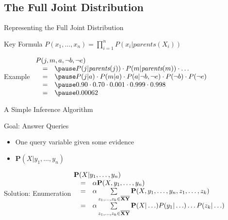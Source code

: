 \documentclass[14pt]{beamer}
\begin{document}
\subsection{The Full Joint Distribution}
\begin{frame}{Representing the Full Joint Distribution}
	\begin{block}{Key Formula}
		$P(x_{1},\ldots,x_{n}) = \prod\limits_{i=1}^{n}{P(x_{i}|\textit{parents}(X_{i}))}$
	\end{block}
	\begin{block}{Example}
		$
		\begin{array}{lll}
			\lefteqn{P(j, m, a, \lnot b, \lnot e)}
			\\
			& = & \pause
			      P(j|\textit{parents}(j)) \cdot
			      P(m|\textit{parents}(m)) \cdot
			      \ldots
			\\
			& = & \pause
			      P(j|a) \cdot
			      P(m|a) \cdot
			      P(a|\lnot b, \lnot e) \cdot
			      P(\lnot b) \cdot
			      P(\lnot e)
			\\
			& = & \pause
			      0.90 \cdot
			      0.70 \cdot
			      0.001 \cdot
			      0.999 \cdot
			      0.998
			\\
			& = & \pause
			      0.00062
		\end{array}
		$
	\end{block}
\end{frame}
\begin{frame}{A Simple Inference Algorithm}
	\begin{block}{Goal: Answer Queries}
		\begin{itemize}
			\item One query variable given some evidence
			\item $\mathbf{P}(X|y_{1},\ldots,y_{n})$
		\end{itemize}
	\end{block}
	\pause
	\begin{block}{Solution: Enumeration}
		$
		\begin{array}{@{}lll@{}}
			\lefteqn{\mathbf{P}(X|y_{1},\ldots,y_{n})} \\
			& = & \alpha\mathbf{P}(X,y_{1},\ldots,y_{n}) \\
			& = & \alpha\sum\limits_{z_{1},\ldots,z_{k} \in \mathbf{\overline{XY}}}
			      {\mathbf{P}(X,y_{1},\ldots,y_{n},z_{1},\ldots,z_{k})} \\
			& = & \alpha\sum\limits_{z_{1},\ldots,z_{k} \in \mathbf{\overline{XY}}}
			      {\mathbf{P}(X|\ldots)
			       P(y_{1}|\ldots)
			       \ldots
			       P(z_{k}|\ldots)} \\
		\end{array}
		$
	\end{block}
\end{frame}
\end{document}
